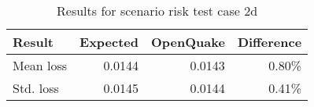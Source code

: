 \begin{table}[htbp]

\centering
\begin{tabular}{ l r r r }

\hline
\rowcolor{anti-flashwhite}
\bf{Result} & \bf{Expected} & \bf{OpenQuake} & \bf{Difference}\\
\hline
Mean loss & 0.0144 & 0.0143 & 0.80\% \\
Std. loss & 0.0145 & 0.0144 & 0.41\% \\
\hline
\end{tabular}

\caption{Results for scenario risk test case 2d}
\label{tab:result-scenario-risk-2d}
\end{table}
